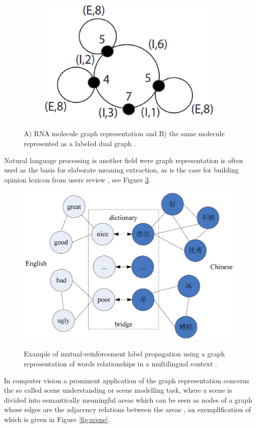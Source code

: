 \begin{figure}[ht]
\begin{subfigure}{.4\textwidth}
        \includegraphics[width=\linewidth]{Figures/ldgrna}
        \label{fig:ldg}
        \caption{}
    \end{subfigure}
    \caption{A) RNA molecule graph representation and B) the same molecule represented
        as a labeled dual graph \cite{conf/psb/KarklinMH05}.}
    \label{fig:bio}
\end{figure}

Natural language processing is another field were graph representation is often used
as the basis for elaborate meaning extraction, as is the case for building opinion
lexicon from users review \cite{10.1371/journal.pone.0079294}, see Figure \ref{fig:wordrel}.

\begin{figure}[ht]
    \centering
    \includegraphics[width=.6\linewidth]{Figures/wordrel}
    \label{fig:wordrel}
    \caption{Example of mutual-reinforcement label propagation using a graph
    representation of words relationships in a multilingual context \cite{10.1371/journal.pone.0079294}.}
\end{figure}

In computer vision a prominent application of the graph representation concerns
the so called scene understanding or scene modelling task, where a scene is divided
into semantically meaningful areas which can be seen as nodes of a graph whose
edges are the adjacency relations between the areas \cite{journals/corr/abs-1108-4079},
an exemplification of which is given in Figure \ref{fig:scene}.

